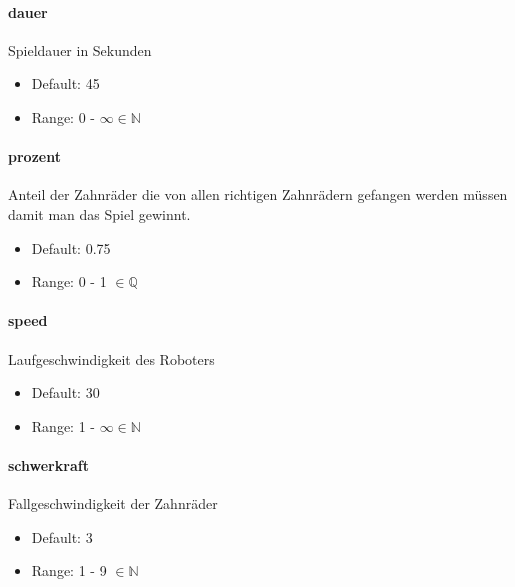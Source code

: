 \documentclass[
  paper=a4,
  ,captions=tableheading
]{scrartcl}
\providecommand{\tightlist}{%
  \setlength{\itemsep}{0pt}\setlength{\parskip}{0pt}}
\begin{document}
\hypertarget{dauer}{%
\paragraph{dauer}\label{dauer}}

Spieldauer in Sekunden

\begin{itemize}
\tightlist
\item
  Default: 45
\item
  Range: 0 - \(\infty \in \mathbb{N}\)
\end{itemize}

\hypertarget{prozent}{%
\paragraph{prozent}\label{prozent}}

Anteil der Zahnräder die von allen richtigen Zahnrädern gefangen werden
müssen damit man das Spiel gewinnt.

\begin{itemize}
\tightlist
\item
  Default: 0.75
\item
  Range: 0 - 1 \(\in \mathbb{Q}\)
\end{itemize}

\hypertarget{speed}{%
\paragraph{speed}\label{speed}}

Laufgeschwindigkeit des Roboters

\begin{itemize}
\tightlist
\item
  Default: 30
\item
  Range: 1 - \(\infty \in \mathbb{N}\)
\end{itemize}

\hypertarget{schwerkraft}{%
\paragraph{schwerkraft}\label{schwerkraft}}

Fallgeschwindigkeit der Zahnräder

\begin{itemize}
\tightlist
\item
  Default: 3
\item
  Range: 1 - 9 \(\in \mathbb{N}\)
\end{itemize}
\end{document}
